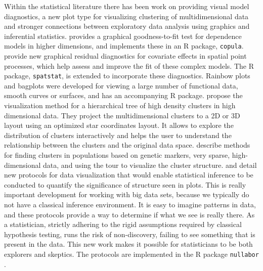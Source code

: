 \documentclass{article}
\begin{document}
Within the statistical literature there has been work on providing visual model diagnostics, a new plot type for visualizing clustering of multidimensional data and stronger connections between exploratory data analysis using graphics and inferential statistics. \citet{hofert2013graphical} provides a graphical goodness-to-fit test for dependence models in higher dimensions, and implements these in an R package, {\tt copula}. \citet{baddeley2013residual} provide new graphical residual diagnostics for covariate effects in spatial point processes, which help assess and improve the fit of these complex models. The R package, {\tt spatstat}, is extended to incorporate these diagnostics. Rainbow plots and bagplots \citep{rainbow} were developed for viewing a large number of functional data, smooth curves or surfaces, and has an accompanying R package. \citet{van2011visualizing} propose the visualization method for a hierarchical tree of high density clusters in high dimensional data. They project the multidimensional clusters to a 2D or 3D layout using an optimized star coordinates layout. It allows to explore the distribution of clusters interactively and helps the user to understand the relationship between the clusters and the original data space. \citet{newell} describe methods for finding clusters in populations based on genetic markers, very sparse, high-dimensional data, and using the tour \cite{As85} to visualize the cluster structure. \citet{buja:2009} and \citet{majumder:2013} detail new protocols for data visualization that would enable statistical inference to be conducted to quantify the significance of structure seen in plots. This is really important development for working with big data sets, because we typically do not have a classical inference environment. It is easy to imagine patterns in data, and these protocols provide a way to determine if what we see is really there. As a statistician, strictly adhering to the rigid assumptions required by classical hypothesis testing, runs the risk of non-discovery, failing to see something that is present in the data. This new work makes it possible for statisticians to be both explorers and skeptics. The protocols are implemented in the R package {\tt nullabor} \citep{nullabor}.  


\end{document}
